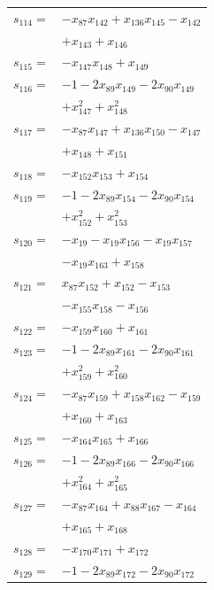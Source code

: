 \begin{longtable}{@{}r@{\;}l@{}}
\(s_{114}=\) & \(\displaystyle -x_{87}x_{142} +x_{136}x_{145} -x_{142}\) \\
 & \(\displaystyle +x_{143} +x_{146}\) \\[3pt]
\(s_{115}=\) & \(\displaystyle -x_{147}x_{148} +x_{149}\) \\[3pt]
\(s_{116}=\) & \(\displaystyle -1 -2x_{89}x_{149} -2x_{90}x_{149}\) \\
 & \(\displaystyle +x_{147}^{2} +x_{148}^{2}\) \\[3pt]
\(s_{117}=\) & \(\displaystyle -x_{87}x_{147} +x_{136}x_{150} -x_{147}\) \\
 & \(\displaystyle +x_{148} +x_{151}\) \\[3pt]
\(s_{118}=\) & \(\displaystyle -x_{152}x_{153} +x_{154}\) \\[3pt]
\(s_{119}=\) & \(\displaystyle -1 -2x_{89}x_{154} -2x_{90}x_{154}\) \\
 & \(\displaystyle +x_{152}^{2} +x_{153}^{2}\) \\[3pt]
\(s_{120}=\) & \(\displaystyle -x_{19} -x_{19}x_{156} -x_{19}x_{157}\) \\
 & \(\displaystyle -x_{19}x_{163} +x_{158}\) \\[3pt]
\(s_{121}=\) & \(\displaystyle x_{87}x_{152} +x_{152} -x_{153}\) \\
 & \(\displaystyle -x_{155}x_{158} -x_{156}\) \\[3pt]
\(s_{122}=\) & \(\displaystyle -x_{159}x_{160} +x_{161}\) \\[3pt]
\(s_{123}=\) & \(\displaystyle -1 -2x_{89}x_{161} -2x_{90}x_{161}\) \\
 & \(\displaystyle +x_{159}^{2} +x_{160}^{2}\) \\[3pt]
\(s_{124}=\) & \(\displaystyle -x_{87}x_{159} +x_{158}x_{162} -x_{159}\) \\
 & \(\displaystyle +x_{160} +x_{163}\) \\[3pt]
\(s_{125}=\) & \(\displaystyle -x_{164}x_{165} +x_{166}\) \\[3pt]
\(s_{126}=\) & \(\displaystyle -1 -2x_{89}x_{166} -2x_{90}x_{166}\) \\
 & \(\displaystyle +x_{164}^{2} +x_{165}^{2}\) \\[3pt]
\(s_{127}=\) & \(\displaystyle -x_{87}x_{164} +x_{88}x_{167} -x_{164}\) \\
 & \(\displaystyle +x_{165} +x_{168}\) \\[3pt]
\(s_{128}=\) & \(\displaystyle -x_{170}x_{171} +x_{172}\) \\[3pt]
\(s_{129}=\) & \(\displaystyle -1 -2x_{89}x_{172} -2x_{90}x_{172}\) \\

\end{longtable}
